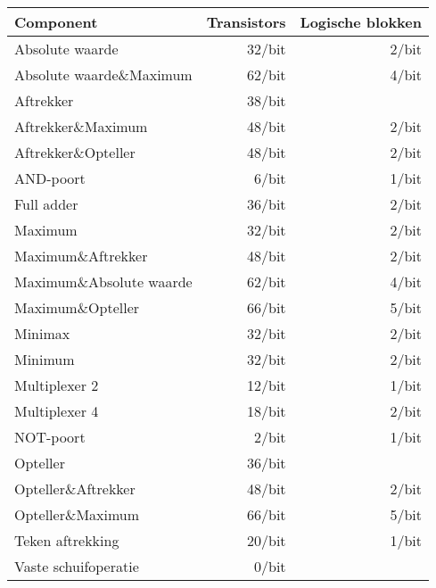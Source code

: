 \begin{tabular}{l|rr}
Component&Transistors&Logische blokken\\\hline
Absolute waarde&32/bit&2/bit\\
Absolute waarde\&Maximum&62/bit&4/bit\\
Aftrekker&38/bit&\\
Aftrekker\&Maximum&48/bit&2/bit\\
Aftrekker\&Opteller&48/bit&2/bit\\
AND-poort&6/bit&1/bit\\
Full adder&36/bit&2/bit\\
Maximum&32/bit&2/bit\\
Maximum\&Aftrekker&48/bit&2/bit\\
Maximum\&Absolute waarde&62/bit&4/bit\\
Maximum\&Opteller&66/bit&5/bit\\
Minimax&32/bit&2/bit\\
Minimum&32/bit&2/bit\\
Multiplexer 2&12/bit&1/bit\\
Multiplexer 4&18/bit&2/bit\\
NOT-poort&2/bit&1/bit\\
Opteller&36/bit&\\
Opteller\&Aftrekker&48/bit&2/bit\\
Opteller\&Maximum&66/bit&5/bit\\
Teken aftrekking&20/bit&1/bit\\
Vaste schuifoperatie&0/bit&\\
\end{tabular}